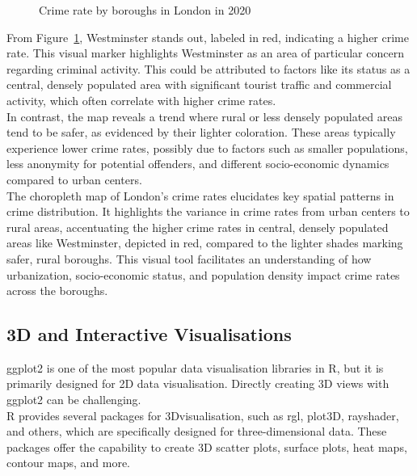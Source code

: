 \documentclass{article}\usepackage[]{graphicx}\usepackage[]{xcolor}
\newenvironment{knitrout}{}{} %
\begin{document}
\begin{figure}[H]
\begin{knitrout}
{}


\end{knitrout}
\centering
\caption{Crime rate by boroughs in London in 2020}
\label{fig:crime rate london}
\end{figure}

\noindent
From Figure~\ref{fig:crime rate london}, Westminster stands out, labeled in red, indicating a higher crime rate. This visual marker highlights Westminster as an area of particular concern regarding criminal activity. This could be attributed to factors like its status as a central, densely populated area with significant tourist traffic and commercial activity, which often correlate with higher crime rates.\\

\noindent
In contrast, the map reveals a trend where rural or less densely populated areas tend to be safer, as evidenced by their lighter coloration. These areas typically experience lower crime rates, possibly due to factors such as smaller populations, less anonymity for potential offenders, and different socio-economic dynamics compared to urban centers.\\

\noindent
The choropleth map of London’s crime rates elucidates key spatial patterns in crime distribution. It highlights the variance in crime rates from urban centers to rural areas, accentuating the higher crime rates in central, densely populated areas like Westminster, depicted in red, compared to the lighter shades marking safer, rural boroughs. This visual tool facilitates an understanding of how urbanization, socio-economic status, and population density impact crime rates across the boroughs.

\subsection{3D and Interactive Visualisations}

ggplot2 is one of the most popular data visualisation libraries in R, but it is primarily designed for 2D data visualisation. Directly creating 3D views with ggplot2 can be challenging.\\

\noindent
R provides several packages for 3Dvisualisation, such as rgl, plot3D, rayshader, and others, which are specifically designed for three-dimensional data. These packages offer the capability to create 3D scatter plots, surface plots, heat maps, contour maps, and more.\\
\end{document}

